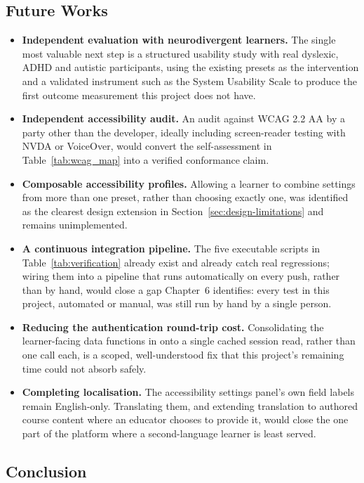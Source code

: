 \documentclass[12pt, oneside]{article} %
\newcommand{\tcode}[1]{\path{#1}}
\begin{document}
\subsection{Future Works}
\label{sec:future-works}

\begin{itemize}
    \item \textbf{Independent evaluation with neurodivergent learners.} The single most valuable next step is a structured usability study with real dyslexic, ADHD and autistic participants, using the existing presets as the intervention and a validated instrument such as the System Usability Scale \cite{brooke1996sus} to produce the first outcome measurement this project does not have.
    \item \textbf{Independent accessibility audit.} An audit against WCAG 2.2 AA by a party other than the developer, ideally including screen-reader testing with NVDA or VoiceOver, would convert the self-assessment in Table~\ref{tab:wcag_map} into a verified conformance claim.
    \item \textbf{Composable accessibility profiles.} Allowing a learner to combine settings from more than one preset, rather than choosing exactly one, was identified as the clearest design extension in Section~\ref{sec:design-limitations} and remains unimplemented.
    \item \textbf{A continuous integration pipeline.} The five executable scripts in Table~\ref{tab:verification} already exist and already catch real regressions; wiring them into a pipeline that runs automatically on every push, rather than by hand, would close a gap Chapter~6 identifies: every test in this project, automated or manual, was still run by hand by a single person.
    \item \textbf{Reducing the authentication round-trip cost.} Consolidating the learner-facing data functions in \tcode{learner-api.ts} onto a single cached session read, rather than one \tcode{auth.getUser()} call each, is a scoped, well-understood fix that this project's remaining time could not absorb safely.
    \item \textbf{Completing localisation.} The accessibility settings panel's own field labels remain English-only. Translating them, and extending translation to authored course content where an educator chooses to provide it, would close the one part of the platform where a second-language learner is least served.
\end{itemize}

\subsection{Conclusion}
\end{document}
